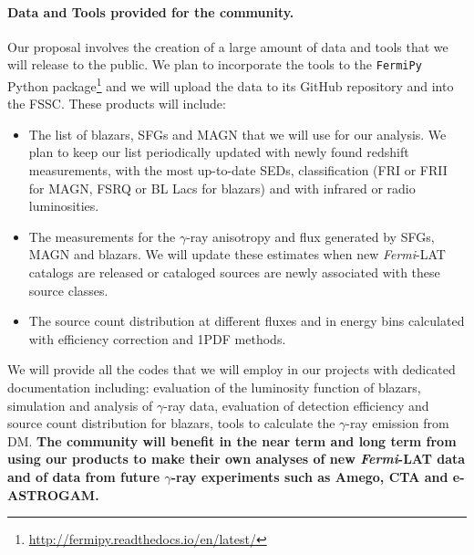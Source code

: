 \documentclass[12 pt]{article}
\newcommand{\FIXME}[1]{{\color{red}{\em Comment: }{#1}}}
\begin{document}
\paragraph{Data and Tools provided for the community.}
Our proposal involves the creation of a large amount of data and tools that we will release to the public. We plan to incorporate the tools to the {\tt FermiPy} Python package\footnote{\url{http://fermipy.readthedocs.io/en/latest/}} and we will upload the data to its GitHub repository and into the FSSC.
These products will include:
\begin{itemize}
\vspace{-0.3cm}
\item The list of blazars, SFGs and MAGN that we will use for our analysis.
We plan to keep our list periodically updated with newly found redshift measurements, with the most up-to-date SEDs, classification (FRI or FRII for MAGN, FSRQ or BL Lacs for blazars) and with infrared or radio luminosities.
\vspace{-0.3cm}
\item The measurements for the $\gamma$-ray anisotropy and flux generated by SFGs, MAGN and blazars. We will update these estimates when new {\it Fermi}-LAT catalogs are released or cataloged sources are newly associated with these source classes.
\vspace{-0.3cm}
\item The source count distribution at different fluxes and in energy bins calculated with efficiency correction and 1PDF methods.
\vspace{-0.3cm}
\end{itemize}
We will provide all the codes that we will employ in our projects with dedicated documentation including: evaluation of the luminosity function of blazars, simulation and analysis of $\gamma$-ray data, evaluation of detection efficiency and source count distribution for blazars, tools to calculate the $\gamma$-ray emission from DM.
{\bf The community will benefit in the near term and long term from using our products to make their own analyses of new {\it Fermi}-LAT data and of data from future $\gamma$-ray experiments such as Amego, CTA and e-ASTROGAM.}

\vspace{-0.5cm}
\end{document}
